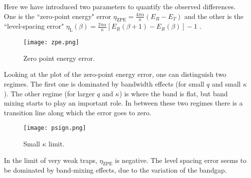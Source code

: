 \documentclass[twocolumn, 10pt, aps, superscriptaddress, floatfix, showpacs, prb, citeautoscript]{revtex4-1}
\begin{document}
Here we have introduced two parameters to quantify the observed
differences. One is the ``zero-point energy" error $\eta_{\text{ZPE}} =
\frac{4\pi\alpha}{\kappa} (E_R - E_T)$ and the other is the
``level-spacing error" $\eta_{\text{L}} (\beta) = \frac{2\pi
\alpha}{\kappa} [E_R(\beta+1) - E_R(\beta)] -1$ .

\begin{figure}[htb]
  \centerline{\texttt{[image: zpe.png]}}
  \caption{Zero point energy error.}
  \label{fig:zpe}
\end{figure}


Looking at the plot of the zero-point energy error, one can
distinguish two regimes. The first one is dominated by bandwidth
effects (for small $q$ and small $\kappa$). The other regime (for
larger $q$ and $\kappa$) is where the band is flat, but band mixing
starts to play an important role. In between these two regimes there
is a transition line along which the error goes to zero.


\begin{figure}[htb]
  \centerline{\texttt{[image: psign.png]}}
  \caption{Small $\kappa$ limit.}
  \label{fig:error_small_kappa}
\end{figure}


In the limit of very weak traps, $\eta_{\text{ZPE}}$ is negative.
The level spacing error seems to be dominated by band-mixing effects, due to the variation of the bandgap.
\end{document}
